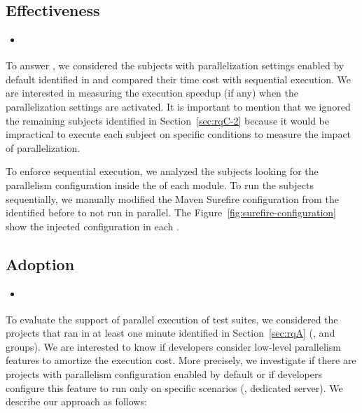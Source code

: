 \subsection{Effectiveness}
\label{sec:rqD}

\begin{itemize}
    \item \textbf{\RQD}
\end{itemize}

To answer \numRQD{}, we considered the \numProjectsPar{} subjects with
parallelization settings enabled by default identified in \numRQC{}
and compared their time cost with sequential execution. We are
interested in measuring the execution speedup (if any) when the
parallelization settings are activated. It is important to mention
that we ignored the remaining  subjects identified in
Section~\ref{sec:rqC-2} because it would be impractical to execute
each subject on specific conditions to measure the impact of
parallelization.

To enforce sequential execution,  we 
analyzed the \numProjectsPar{} subjects looking for the parallelism 
configuration inside the \pomf{} of each module. To run the subjects
sequentially, we manually modified the Maven Surefire configuration
from the \numPomMatched{} identified before to not run in parallel.
The Figure~\ref{fig:surefire-configuration} show the injected configuration
in each \pomf{}.



\begin{center}
\end{center}

\subsection{Adoption}
\label{sec:rqC}
\label{sec:rqE}

\begin{itemize}
    \item \emph{\RQC}
\end{itemize}

To evaluate the support of parallel execution of test suites, we
considered the \numMedLong{} projects that ran in at least one minute
identified in Section~\ref{sec:rqA} (\ie, \medg{} and \longg{}
groups). We are interested to know if developers consider low-level
parallelism features to amortize the execution cost. More precisely,
we investigate if there are projects with parallelism configuration
enabled by default or if developers configure this feature to run only
on specific scenarios (\eg, dedicated server).  We describe our
approach as follows:


